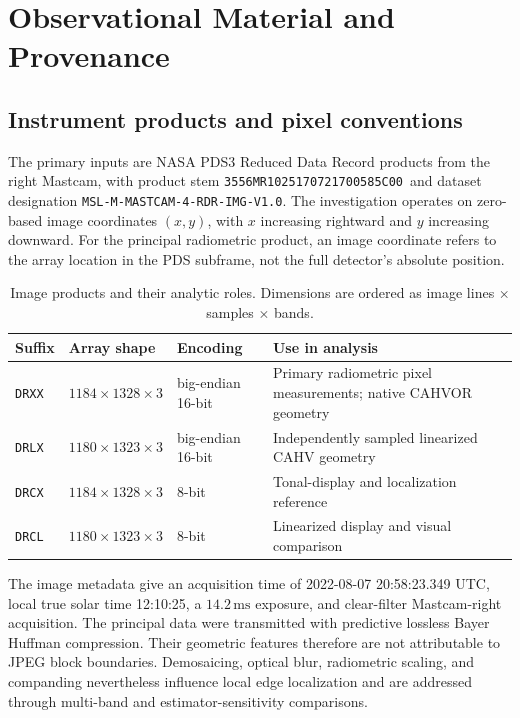 \documentclass[11pt,letterpaper]{article}
\newcommand{\pdsid}{\texttt{3556MR1025170721700585C00}}
\begin{document}
\section{Observational Material and Provenance}
\label{sec:data}

\subsection{Instrument products and pixel conventions}

The primary inputs are NASA PDS3 Reduced Data Record products from the right Mastcam, with product stem \pdsid\ and dataset designation \texttt{MSL-M-MASTCAM-4-RDR-IMG-V1.0}. The investigation operates on zero-based image coordinates \((x,y)\), with \(x\) increasing rightward and \(y\) increasing downward. For the principal radiometric product, an image coordinate refers to the array location in the PDS subframe, not the full detector's absolute position.

\begin{table}[ht]
\centering\small
\caption{Image products and their analytic roles. Dimensions are ordered as image lines \(\times\) samples \(\times\) bands.}
\label{tab:products}
\begin{tabularx}{\linewidth}{@{}l l l X@{}}
\toprule
\textbf{Suffix} & \textbf{Array shape} & \textbf{Encoding} & \textbf{Use in analysis} \\
\midrule
\texttt{DRXX} & \(1184\times1328\times3\) & big-endian 16-bit & Primary radiometric pixel measurements; native CAHVOR geometry \\
\texttt{DRLX} & \(1180\times1323\times3\) & big-endian 16-bit & Independently sampled linearized CAHV geometry \\
\texttt{DRCX} & \(1184\times1328\times3\) & 8-bit & Tonal-display and localization reference \\
\texttt{DRCL} & \(1180\times1323\times3\) & 8-bit & Linearized display and visual comparison \\
\bottomrule
\end{tabularx}
\end{table}

The image metadata give an acquisition time of 2022-08-07 20:58:23.349 UTC, local true solar time 12:10:25, a \(14.2\,\mathrm{ms}\) exposure, and clear-filter Mastcam-right acquisition. The principal data were transmitted with predictive lossless Bayer Huffman compression. Their geometric features therefore are not attributable to JPEG block boundaries. Demosaicing, optical blur, radiometric scaling, and companding nevertheless influence local edge localization and are addressed through multi-band and estimator-sensitivity comparisons.
\end{document}

